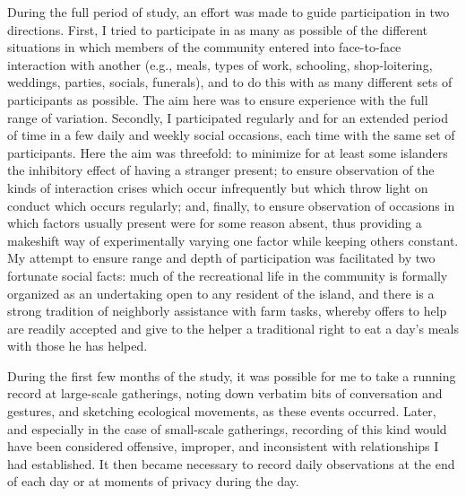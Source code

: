 \documentclass[twoside,symmetric,nobib,justified]{tufte-book}
\begin{document}
During the full period of study, an effort was made to guide
participation in two directions. First, I tried to participate in as
many as possible of the different situations in which members of the
community entered into face-to-face interaction with another (e.g.,
meals, types of work, schooling, shop-loitering, weddings, parties,
socials, funerals), and to do this with as many different sets of
participants as possible. The aim here was to ensure experience with the
full range of variation. Secondly, I participated regularly and for an
extended period of time in a few daily and weekly social occasions, each
time with the same set of participants. Here the aim was threefold: to
minimize for at least some islanders the inhibitory effect of having a
stranger present; to ensure observation of the kinds of interaction
crises which occur infrequently but which throw light on conduct which
occurs regularly; and, finally, to ensure observation of occasions in
which factors usually present were for some reason absent, thus
providing a makeshift way of experimentally varying one factor while
keeping others constant. My attempt to ensure range and depth of
participation was facilitated by two fortunate social facts: much of the
recreational life in the community is formally organized as an
undertaking open to any resident of the island, and there is a strong
tradition of neighborly assistance with farm tasks, whereby offers to
help are readily accepted and give to the helper a traditional right to
eat a day's meals with those he has helped.

During the first few months of the study, it was possible for me to take
a running record at large-scale gatherings, noting down verbatim bits of
conversation and gestures, and sketching ecological movements, as these
events occurred. Later, and especially in the case of small-scale
gatherings, recording of this kind would have been considered offensive,
improper, and inconsistent with relationships I had established. It then
became necessary to record daily observations at the end of each day or
at moments of privacy during the day.
\end{document}
